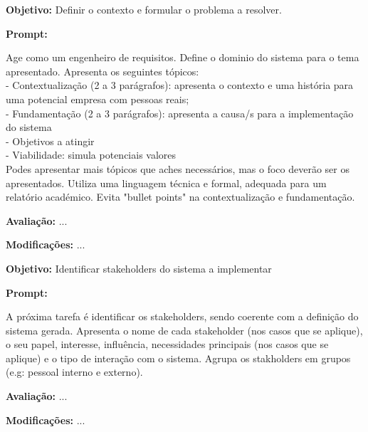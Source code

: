 \documentclass[a4paper,12pt]{scrreprt}
\begin{document}
\begin{tcolorbox}[
	title={Prompt P2 - Definição do domínio do sistema},
	colback=white,
	colframe=black,
	arc=2mm,
	boxrule=0.5pt
	]
	\textbf{Objetivo:} Definir o contexto e formular o problema a resolver. \par
	\textbf{Prompt:} 
	\begin{tcolorbox}[
		listing only,
		breakable,
		enhanced,
		colback=white,
		colframe=black,
		listing options={
			breaklines=true,
			basicstyle=\ttfamily\small
		}
		]
		Age como um engenheiro de requisitos. Define o dominio do sistema para o tema apresentado. Apresenta os seguintes tópicos: \\
		- Contextualização (2 a 3 parágrafos): apresenta o contexto e uma história para uma potencial empresa com pessoas reais; \\
		- Fundamentação (2 a 3 parágrafos): apresenta a causa/s para a implementação do sistema \\
		- Objetivos a atingir \\
		- Viabilidade: simula potenciais valores \\
		Podes apresentar mais tópicos que aches necessários, mas o foco deverão ser os apresentados. Utiliza uma linguagem técnica e formal, adequada para um relatório académico. Evita "bullet points" na contextualização e fundamentação.
	\end{tcolorbox}
	\par
	\textbf{Avaliação:} ... \par
	\textbf{Modificações:} ... \par
\end{tcolorbox}

\begin{tcolorbox}[
	title={Prompt P3 - Indentificação de Stakeholders},
	colback=white,
	colframe=black,
	arc=2mm,
	boxrule=0.5pt
	]
	\textbf{Objetivo:} Identificar stakeholders do sistema a implementar \par
	\textbf{Prompt:} 
	\begin{tcolorbox}[
		listing only,
		breakable,
		enhanced,
		colback=white,
		colframe=black,
		listing options={
			breaklines=true,
			basicstyle=\ttfamily\small
		}
		]
		A próxima tarefa é identificar os stakeholders, sendo coerente com a definição do sistema gerada. Apresenta o nome de cada stakeholder (nos casos que se aplique), o seu papel, interesse, influência, necessidades principais (nos casos que se aplique) e o tipo de interação com o sistema. Agrupa os stakholders em grupos (e.g: pessoal interno e externo).
	\end{tcolorbox}
	 \par
	\textbf{Avaliação:} ... \par
	\textbf{Modificações:} ... \par
\end{tcolorbox}
\end{document}
